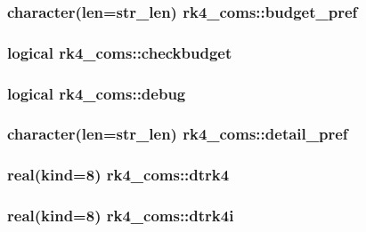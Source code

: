 \subsubsection[{budget\+\_\+pref}]{\setlength{\rightskip}{0pt plus 5cm}character(len=str\+\_\+len) rk4\+\_\+coms\+::budget\+\_\+pref}\label{namespacerk4__coms_a2da1f732b9648b485c93d62814060cf2}
\hypertarget{namespacerk4__coms_a9b8354d59e352fedb78f49d2195a9d7a}{}
\subsubsection[{checkbudget}]{\setlength{\rightskip}{0pt plus 5cm}logical rk4\+\_\+coms\+::checkbudget}\label{namespacerk4__coms_a9b8354d59e352fedb78f49d2195a9d7a}
\hypertarget{namespacerk4__coms_a5abb49d2a6e86524f3c3bf3f67468c21}{}
\subsubsection[{debug}]{\setlength{\rightskip}{0pt plus 5cm}logical rk4\+\_\+coms\+::debug}\label{namespacerk4__coms_a5abb49d2a6e86524f3c3bf3f67468c21}
\hypertarget{namespacerk4__coms_acd58047348a9b1ff25ec1afda9163705}{}
\subsubsection[{detail\+\_\+pref}]{\setlength{\rightskip}{0pt plus 5cm}character(len=str\+\_\+len) rk4\+\_\+coms\+::detail\+\_\+pref}\label{namespacerk4__coms_acd58047348a9b1ff25ec1afda9163705}
\hypertarget{namespacerk4__coms_affa4e03ec127e7def8035b8b32bdb5b8}{}
\subsubsection[{dtrk4}]{\setlength{\rightskip}{0pt plus 5cm}real(kind=8) rk4\+\_\+coms\+::dtrk4}\label{namespacerk4__coms_affa4e03ec127e7def8035b8b32bdb5b8}
\hypertarget{namespacerk4__coms_a987c7ccf90cfcf40c2a925b2c1057404}{}
\subsubsection[{dtrk4i}]{\setlength{\rightskip}{0pt plus 5cm}real(kind=8) rk4\+\_\+coms\+::dtrk4i}\label{namespacerk4__coms_a987c7ccf90cfcf40c2a925b2c1057404}
\hypertarget{namespacerk4__coms_aae531dd6ba4cf10a03c3fad2b61071bb}{}
